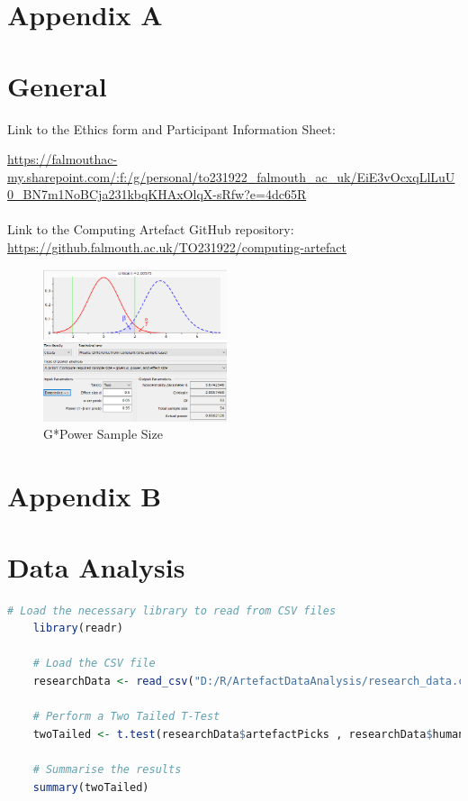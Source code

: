 \newpage
\section*{Appendix A} \label{append:a}
\section*{General}
Link to the Ethics form and Participant Information Sheet:

\url{https://falmouthac-my.sharepoint.com/:f:/g/personal/to231922_falmouth_ac_uk/EiE3vOcxqLlLuU0_BN7m1NoBCja231kbqKHAxOlqX-sRfw?e=4dc65R}
\\
\\
Link to the Computing Artefact GitHub repository: 
\url{https://github.falmouth.ac.uk/TO231922/computing-artefact}
\begin{figure}[ht]
    \includegraphics[width=0.48\textwidth]{./Images/gpower.png}
    \centering
    \caption{G*Power Sample Size}
    \label{gpower}
\end{figure}

\newpage
\section*{Appendix B}
\section*{Data Analysis}
\label{append:b}
\begin{lstlisting}[language=R, caption = Example R code for a Two Tailed T-Test using data from an imported CSV file]
    # Load the necessary library to read from CSV files
    library(readr)

    # Load the CSV file
    researchData <- read_csv("D:/R/ArtefactDataAnalysis/research_data.csv")

    # Perform a Two Tailed T-Test
    twoTailed <- t.test(researchData$artefactPicks , researchData$humanPicks)

    # Summarise the results
    summary(twoTailed)
\end{lstlisting}


